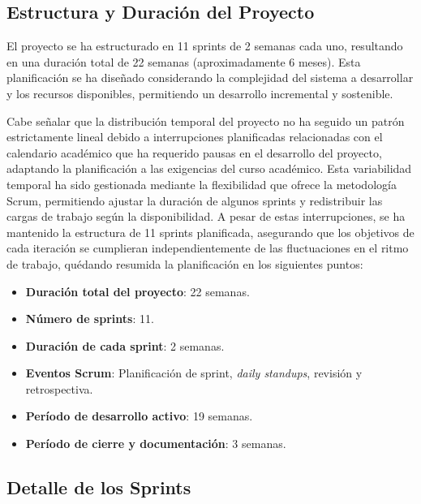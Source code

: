 
\subsection{Estructura y Duración del Proyecto}
El proyecto se ha estructurado en 11 sprints de 2 semanas cada uno, resultando en una duración total de 22 semanas (aproximadamente 6 meses). Esta planificación se ha diseñado considerando la complejidad del sistema a desarrollar y los recursos disponibles, permitiendo un desarrollo incremental y sostenible.

Cabe señalar que la distribución temporal del proyecto no ha seguido un patrón estrictamente lineal debido a interrupciones planificadas relacionadas con el calendario académico que ha requerido pausas en el desarrollo del proyecto, adaptando la planificación a las exigencias del curso académico. Esta variabilidad temporal ha sido gestionada mediante la flexibilidad que ofrece la metodología Scrum, permitiendo ajustar la duración de algunos sprints y redistribuir las cargas de trabajo según la disponibilidad. A pesar de estas interrupciones, se ha mantenido la estructura de 11 sprints planificada, asegurando que los objetivos de cada iteración se cumplieran independientemente de las fluctuaciones en el ritmo de trabajo, quédando resumida la planificación en los siguientes puntos:

\begin{itemize}
\tightlist
\item
\textbf{Duración total del proyecto}: 22 semanas.
\item
\textbf{Número de sprints}: 11.
\item
\textbf{Duración de cada sprint}: 2 semanas.
\item
\textbf{Eventos Scrum}: Planificación de sprint, \emph{daily standups}, revisión y retrospectiva.
\item
\textbf{Período de desarrollo activo}: 19 semanas.
\item
\textbf{Período de cierre y documentación}: 3 semanas.
\end{itemize}

\subsection{Detalle de los Sprints}

